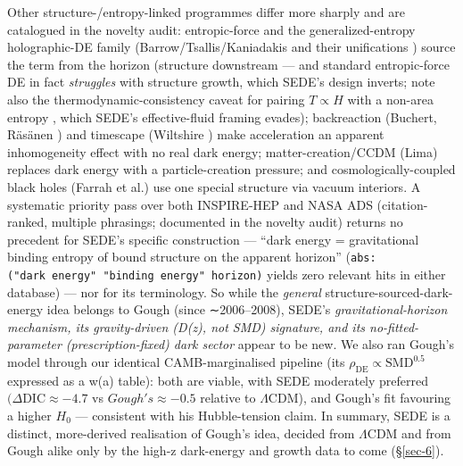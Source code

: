 \documentclass[preprint,12pt]{elsarticle}
\begin{document}
Other structure-/entropy-linked programmes differ more sharply and are
catalogued in the novelty audit: entropic-force
\citep{Easson:2010av, Basilakos:2012ra} and the generalized-entropy
holographic-DE family (Barrow/Tsallis/Kaniadakis and their unifications
\citep{Nojiri:2022dkr, Anagnostopoulos:2020ctz, Saridakis:2020lrg})
source the term from the horizon (structure downstream --- and standard
entropic-force DE in fact \emph{struggles} with structure growth, which
SEDE's design inverts; note also the thermodynamic-consistency caveat
for pairing \(T\!\propto\!H\) with a non-area entropy
\citep{Gohar:2023hnb}, which SEDE's effective-fluid framing evades);
backreaction (Buchert, Räsänen \citep{Buchert:2007ik, Rasanen:2003fpa})
and timescape (Wiltshire \citep{Wiltshire:2007fg}) make acceleration an
apparent inhomogeneity effect with no real dark energy;
matter-creation/CCDM (Lima) replaces dark energy with a
particle-creation pressure; and cosmologically-coupled black holes
(Farrah et al.) use one special structure via vacuum interiors. A
systematic priority pass over both INSPIRE-HEP and NASA ADS
(citation-ranked, multiple phrasings; documented in the novelty audit)
returns no precedent for SEDE's specific construction --- ``dark energy
= gravitational binding entropy of bound structure on the apparent
horizon'' (\texttt{abs:("dark\ energy"\ "binding\ energy"\ horizon)}
yields zero relevant hits in either database) --- nor for its
terminology. So while the \emph{general} structure-sourced-dark-energy
idea belongs to Gough (since ∼2006--2008), SEDE's
\emph{gravitational-horizon mechanism, its gravity-driven (D(z), not
SMD) signature, and its no-fitted-parameter (prescription-fixed) dark
sector} appear to be new. We also ran Gough's model through our
identical CAMB-marginalised pipeline (its
\(\rho _\mathrm{DE} \propto  \mathrm{SMD}^{0.5}\) expressed as a w(a)
table): both are viable, with SEDE moderately preferred
\((\Delta \mathrm{DIC} \approx  -4.7\) vs \(Gough's \approx  -0.5\)
relative to \(\Lambda \mathrm{CDM}\)), and Gough's fit favouring a
higher \(H_{0}\) --- consistent with his Hubble-tension claim. In
summary, SEDE is a distinct, more-derived realisation of Gough's idea,
decided from \(\Lambda \mathrm{CDM}\) and from Gough alike only by the
high-z dark-energy and growth data to come (§\ref{sec-6}).
\end{document}

